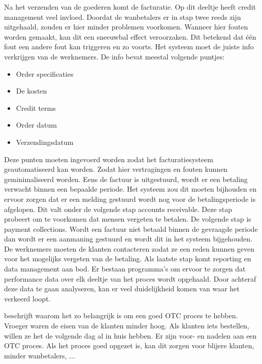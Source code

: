 Na het verzenden van de goederen komt de facturatie. Op dit deeltje heeft credit management veel invloed. Doordat de wanbetalers er in stap twee reeds zijn uitgehaald, zouden er hier minder problemen voorkomen. Wanneer hier fouten worden gemaakt, kan dit een sneeuwbal effect veroorzaken. Dit betekend dat één fout een andere fout kan triggeren en zo voorts. Het systeem moet de juiste info verkrijgen van de  werknemers. De info bevat meestal volgende puntjes:
\begin{itemize}
	\item Order specificaties
	\item De kosten
	\item Credit terms
	\item Order datum
	\item Verzendingsdatum
\end{itemize}
Deze punten moeten ingevoerd worden zodat het facturatiesysteem geautomatiseerd kan worden. Zodat hier vertragingen en fouten kunnen geminimaliseerd worden. Eens de factuur is uitgestuurd, wordt er een betaling verwacht binnen een bepaalde periode. Het systeem zou dit moeten bijhouden en ervoor zorgen dat er een melding gestuurd wordt nog voor de betalingsperiode is afgelopen. Dit valt onder de volgende stap accounts receivable. Deze stap probeert om te voorkomen dat mensen vergeten te betalen. 
De volgende stap is payment collections. Wordt een factuur niet betaald binnen de gevraagde periode dan wordt er een aanmaning gestuurd en wordt dit in het systeem bijgehouden. De  werknemers moeten de klanten contacteren zodat ze een reden kunnen geven voor het mogelijks vergeten van de betaling. 
Als laatste stap komt reporting en data management aan bod. Er bestaan programma's om ervoor te zorgen dat performance data over elk deeltje van het proces wordt opgehaald. Door achteraf deze data te gaan analyseren, kan er veel duidelijkheid komen van waar het verkeerd loopt. 

\textcite{PEARSON2017} beschrijft waarom het zo belangrijk is om een goed OTC proces te hebben. Vroeger waren de eisen van de klanten minder hoog. Als klanten iets bestellen, willen ze het de volgende dag al in huis hebben. Er zijn voor- en nadelen aan een OTC proces. Als het proces goed opgezet is, kan dit zorgen voor blijere klanten, minder wanbetalers, ... 

